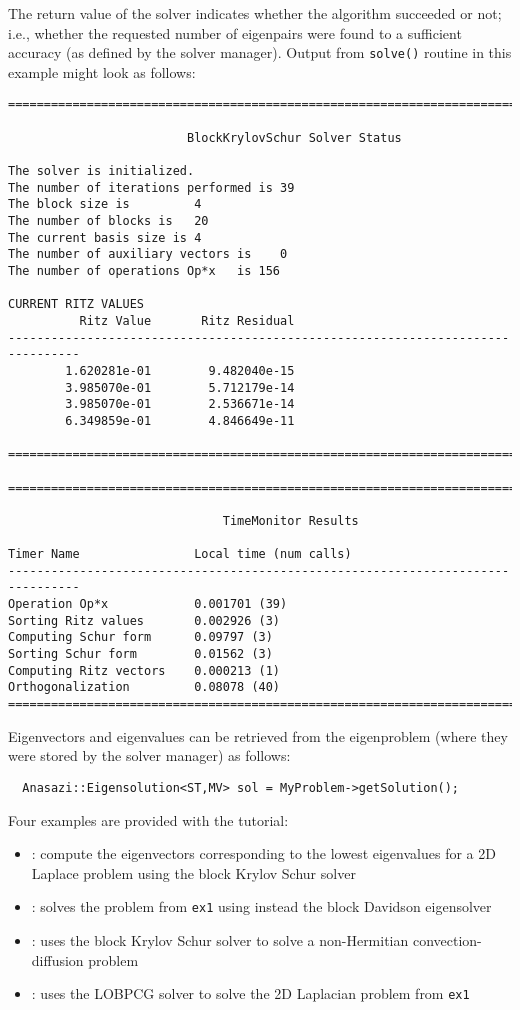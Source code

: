 The return value of the solver indicates whether the algorithm succeeded or not; i.e.,
whether the requested number of eigenpairs were found to a sufficient accuracy (as defined
by the solver manager).
Output from \verb!solve()! routine in this example might look as follows:
\begin{verbatim}
================================================================================

                         BlockKrylovSchur Solver Status

The solver is initialized.
The number of iterations performed is 39
The block size is         4
The number of blocks is   20
The current basis size is 4
The number of auxiliary vectors is    0
The number of operations Op*x   is 156

CURRENT RITZ VALUES             
          Ritz Value       Ritz Residual
--------------------------------------------------------------------------------
        1.620281e-01        9.482040e-15
        3.985070e-01        5.712179e-14
        3.985070e-01        2.536671e-14
        6.349859e-01        4.846649e-11

================================================================================

================================================================================

                              TimeMonitor Results

Timer Name                Local time (num calls)    
--------------------------------------------------------------------------------
Operation Op*x            0.001701 (39)             
Sorting Ritz values       0.002926 (3)              
Computing Schur form      0.09797 (3)               
Sorting Schur form        0.01562 (3)               
Computing Ritz vectors    0.000213 (1)              
Orthogonalization         0.08078 (40)              
================================================================================
\end{verbatim}

Eigenvectors and eigenvalues can be retrieved from the eigenproblem (where they were
stored by the solver manager) as follows:
\begin{verbatim}
  Anasazi::Eigensolution<ST,MV> sol = MyProblem->getSolution();
\end{verbatim}

Four examples are provided with the tutorial:
\begin{itemize}
\item {}: compute the eigenvectors
corresponding to the lowest eigenvalues for a 2D Laplace problem using the block
Krylov Schur solver
\item {}: solves the problem from \verb!ex1! 
using instead the block Davidson eigensolver
\item {}: uses the block Krylov Schur solver to solve a
  non-Hermitian convection-diffusion problem
\item {}: uses the LOBPCG solver to solve the 2D Laplacian
problem from \verb!ex1!
\end{itemize}

